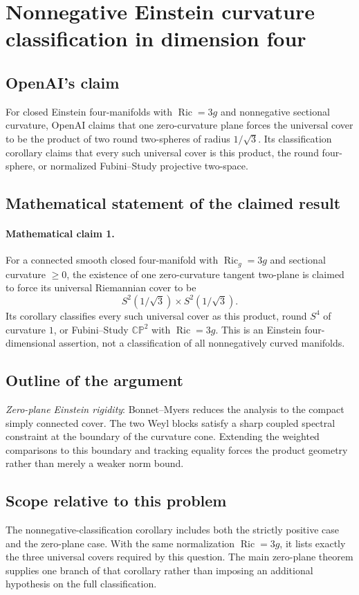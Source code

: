 \documentclass[11pt]{article}
\begin{document}
\section*{Nonnegative Einstein curvature classification in dimension four}

\subsection{OpenAI's claim}
For closed Einstein four-manifolds with $\operatorname{Ric}=3g$ and nonnegative sectional curvature, OpenAI claims that one zero-curvature plane forces the universal cover to be the product of two round two-spheres of radius $1/\sqrt3$. Its classification corollary claims that every such universal cover is this product, the round four-sphere, or normalized Fubini--Study projective two-space.

\subsection{Mathematical statement of the claimed result}
\paragraph{Mathematical claim 1.} For a connected smooth closed four-manifold with $\operatorname{Ric}_g=3g$ and sectional curvature $\ge0$, the existence of one zero-curvature tangent two-plane is claimed to force its universal Riemannian cover to be \[S^2(1/\sqrt3)\times S^2(1/\sqrt3).\] Its corollary classifies every such universal cover as this product, round $S^4$ of curvature $1$, or Fubini--Study $\mathbb{CP}^2$ with $\operatorname{Ric}=3g$. This is an Einstein four-dimensional assertion, not a classification of all nonnegatively curved manifolds.

\subsection{Outline of the argument}
\textit{Zero-plane Einstein rigidity}: Bonnet--Myers reduces the analysis to the compact simply connected cover. The two Weyl blocks satisfy a sharp coupled spectral constraint at the boundary of the curvature cone. Extending the weighted comparisons to this boundary and tracking equality forces the product geometry rather than merely a weaker norm bound.

\subsection{Scope relative to this problem}
The nonnegative-classification corollary includes both the strictly positive case and the zero-plane case. With the same normalization $\operatorname{Ric}=3g$, it lists exactly the three universal covers required by this question. The main zero-plane theorem supplies one branch of that corollary rather than imposing an additional hypothesis on the full classification.
\end{document}
